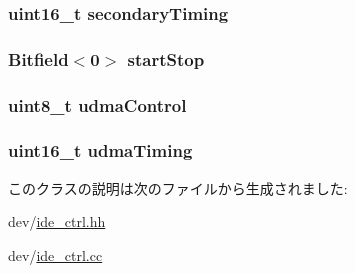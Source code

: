 \label{classIdeController_a9ffe401d4b082d4a20f74809ed096f62}
\hypertarget{classIdeController_a1611c0c216198aa88de03e3ebfd22b43}{
\subsubsection[{secondaryTiming}]{\setlength{\rightskip}{0pt plus 5cm}uint16\_\-t {\bf secondaryTiming}}}
\label{classIdeController_a1611c0c216198aa88de03e3ebfd22b43}
\hypertarget{classIdeController_ace5af3160a3a76b4a51e864f74b16ae5}{
\subsubsection[{startStop}]{\setlength{\rightskip}{0pt plus 5cm}Bitfield$<$0$>$ {\bf startStop}}}
\label{classIdeController_ace5af3160a3a76b4a51e864f74b16ae5}
\hypertarget{classIdeController_a3bc817e4be51f2e1aeb1701ce144cbf1}{
\subsubsection[{udmaControl}]{\setlength{\rightskip}{0pt plus 5cm}uint8\_\-t {\bf udmaControl}}}
\label{classIdeController_a3bc817e4be51f2e1aeb1701ce144cbf1}
\hypertarget{classIdeController_af5a85382debfe463bfebc5ab59624aa5}{
\subsubsection[{udmaTiming}]{\setlength{\rightskip}{0pt plus 5cm}uint16\_\-t {\bf udmaTiming}}}
\label{classIdeController_af5a85382debfe463bfebc5ab59624aa5}


このクラスの説明は次のファイルから生成されました:\begin{DoxyCompactItemize}
\item 
dev/\hyperlink{ide__ctrl_8hh}{ide\_\-ctrl.hh}\item 
dev/\hyperlink{ide__ctrl_8cc}{ide\_\-ctrl.cc}\end{DoxyCompactItemize}
